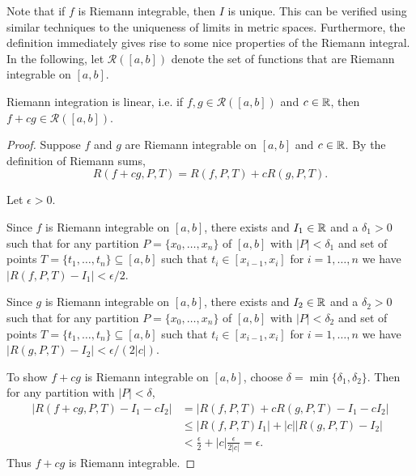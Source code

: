 \documentclass{article}
\begin{document}
Note that if $f$ is Riemann integrable, then $I$ is unique. This can be verified using similar techniques to the uniqueness of limits in metric spaces. Furthermore, the definition immediately gives rise to some nice properties of the Riemann integral. In the following, let $\mathcal{R}([a,b])$ denote the set of functions that are Riemann integrable on $[a,b]$.

\begin{theorem}
Riemann integration is linear, i.e. if $f,g \in \mathcal{R}([a,b])$ and $c \in {\mathbb{R}}$, then $f+ cg \in \mathcal{R}([a,b])$.
\end{theorem}

\begin{proof}
Suppose $f$ and $g$ are Riemann integrable on $[a,b]$ and $c \in {\mathbb{R}}$.
By the definition of Riemann sums, 
$$ R(f+cg,P,T) = R(f,P,T) + cR(g,P,T). $$

Let $\epsilon > 0$.

Since $f$ is Riemann integrable on $[a,b]$, there exists and $I_1 \in {\mathbb{R}}$ and a $\delta_1 > 0$ such that for any partition $P = \{x_0,\ldots,x_n \}$ of $[a,b]$ with $\vert P \vert <\delta_1$ and set of points $T=\{t_1,\ldots, t_n\}\subseteq [a,b]$ such that $t_i \in [x_{i-1},x_i]$ for $i=1,\ldots,n$ we have $\vert R(f,P,T) - I_1 \vert < \epsilon/2$.

Since $g$ is Riemann integrable on $[a,b]$, there exists and $I_2 \in {\mathbb{R}}$ and a $\delta_2 > 0$ such that for any partition $P = \{x_0,\ldots,x_n \}$ of $[a,b]$ with $\vert P \vert <\delta_2$ and set of points $T=\{t_1,\ldots, t_n\}\subseteq [a,b]$ such that $t_i \in [x_{i-1},x_i]$ for $i=1,\ldots,n$ we have $\vert R(g,P,T) - I_2 \vert < \epsilon/(2|c|)$.

To show $f+cg$ is Riemann integrable on $[a,b]$, choose $\delta = \min \{ \delta_1, \delta_2 \}$. Then for any partition with $|P| < \delta$,
\begin{align*}
    |R(f+cg,P,T) - I_1 - cI_2| &= |R(f,P,T) + c R(g,P,T) - I_1 - cI_2| \\
    &\leq |R(f,P,T) I_1| + |c| |R(g,P,T) - I_2| \\
    &< \frac{\epsilon}{2} + |c| \frac{\epsilon}{2|c|} = \epsilon .
\end{align*}
Thus $f+cg$ is Riemann integrable.
\end{proof}
\end{document}
